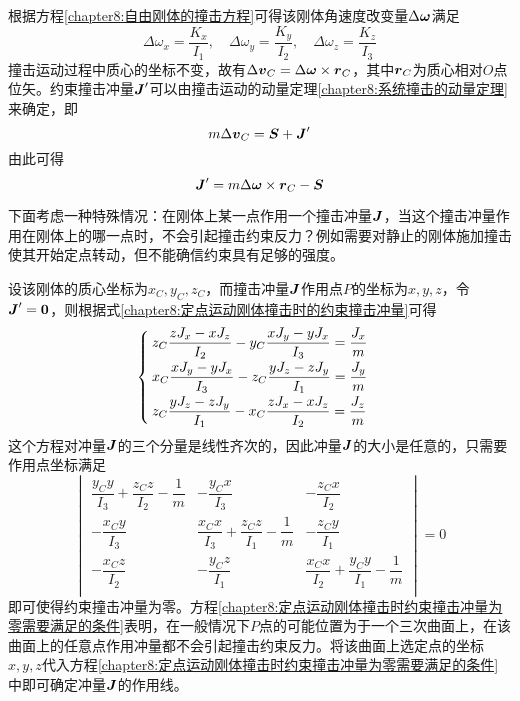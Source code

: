 根据方程\eqref{chapter8:自由刚体的撞击方程}可得该刚体角速度改变量$\Delta \boldsymbol{\omega}$满足
\begin{equation}
	\Delta \omega_x = \frac{K_x}{I_1},\quad \Delta \omega_y = \frac{K_y}{I_2},\quad \Delta \omega_z = \frac{K_z}{I_3}
\end{equation}
撞击运动过程中质心的坐标不变，故有$\Delta\boldsymbol{v}_C = \Delta\boldsymbol{\omega}\times \boldsymbol{r}_C$，其中$\boldsymbol{r}_C$为质心相对$O$点位矢。约束撞击冲量$\boldsymbol{J}'$可以由撞击运动的动量定理\eqref{chapter8:系统撞击的动量定理}来确定，即
\begin{equation*}
	m\Delta \boldsymbol{v}_C = \boldsymbol{S}+\boldsymbol{J}'
\end{equation*}
由此可得
\begin{equation}
	\boldsymbol{J}' = m\Delta\boldsymbol{\omega}\times \boldsymbol{r}_C - \boldsymbol{S}
	\label{chapter8:定点运动刚体撞击时的约束撞击冲量}
\end{equation}

下面考虑一种特殊情况：在刚体上某一点作用一个撞击冲量$\boldsymbol{J}$，当这个撞击冲量作用在刚体上的哪一点时，不会引起撞击约束反力？例如需要对静止的刚体施加撞击使其开始定点转动，但不能确信约束具有足够的强度。

设该刚体的质心坐标为$x_C,y_C,z_C$，而撞击冲量$\boldsymbol{J}$作用点$P$的坐标为$x,y,z$，令$\boldsymbol{J}'=\boldsymbol{0}$，则根据式\eqref{chapter8:定点运动刚体撞击时的约束撞击冲量}可得
\begin{equation}
\begin{cases}
	\displaystyle z_C\frac{zJ_x-xJ_z}{I_2}-y_C\frac{xJ_y-yJ_x}{I_3} = \frac{J_x}{m} \\[1.5ex]
	\displaystyle x_C\frac{xJ_y-yJ_x}{I_3}-z_C\frac{yJ_z-zJ_y}{I_1} = \frac{J_y}{m} \\[1.5ex]
	\displaystyle z_C\frac{yJ_z-zJ_y}{I_1}-x_C\frac{zJ_x-xJ_z}{I_2} = \frac{J_z}{m}
\end{cases}
\end{equation}
这个方程对冲量$\boldsymbol{J}$的三个分量是线性齐次的，因此冲量$\boldsymbol{J}$的大小是任意的，只需要作用点坐标满足
\begin{equation}
	\begin{vmatrix}
		\dfrac{y_Cy}{I_3}+\dfrac{z_Cz}{I_2}-\dfrac1m & -\dfrac{y_Cx}{I_3} & -\dfrac{z_Cx}{I_2} \\[1.5ex]
		-\dfrac{x_Cy}{I_3} & \dfrac{x_Cx}{I_3}+\dfrac{z_Cz}{I_1}-\dfrac1m & -\dfrac{z_Cy}{I_1} \\[1.5ex]
		-\dfrac{x_Cz}{I_2} & -\dfrac{y_Cz}{I_1} & \dfrac{x_Cx}{I_2}+\dfrac{y_Cy}{I_1}-\dfrac1m \\[1.5ex]
	\end{vmatrix} = 0
	\label{chapter8:定点运动刚体撞击时约束撞击冲量为零需要满足的条件}
\end{equation}
即可使得约束撞击冲量为零。方程\eqref{chapter8:定点运动刚体撞击时约束撞击冲量为零需要满足的条件}表明，在一般情况下$P$点的可能位置为于一个三次曲面上，在该曲面上的任意点作用冲量都不会引起撞击约束反力。将该曲面上选定点的坐标$x,y,z$代入方程\eqref{chapter8:定点运动刚体撞击时约束撞击冲量为零需要满足的条件}中即可确定冲量$\boldsymbol{J}$的作用线。

